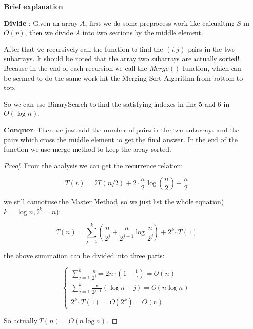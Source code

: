 \documentclass[12pt,a4paper]{article}
\theoremstyle{definition}
\begin{document}
\begin{enumerate}
	\textbf{Brief explanation}


	\textbf{Divide} : Given an array $A$, first we do some preprocess work like calcualting $S$ in $O(n)$, then we divide $A$ into two
	sections by the middle element.
	
	After that we recursively call the function to find the $(i, j)$ pairs in the two subarrays. 
   It should be noted that the array two subarrays are actually sorted! Because in the end of each recursion we call the $Merge()$ function, which can be seemed to do the same work int the
	Merging Sort Algorithm from bottom to top. 
	
	So we can use BinarySearch to find the satisfying indexes in line 5 and 6 in $O(\log n)$.

	\textbf{Conquer}: Then we just add the number of pairs in the two subarrays and the pairs which cross the middle element to get the final answer. In the end of the function we use merge method to keep the array sorted.
	\begin{proof}
	 From the analysis we can get the recurrence relation:
	 
	 \begin{equation*}
		 T(n) = 2T(n/2) + 2\cdot\frac{n}{2}\log(\frac{n}{2}) + \frac{n}{2} 
	 \end{equation*}

	 we still cannotuse the Master Method, so we just list the whole equation($k=\log n, 2^k=n$):

	\begin{equation*}
		T(n) = \sum_{j=1}^{k}(\frac{n}{2^j} + \frac{n}{2^{j - 1}}\log{\frac{n}{2^j}}) + 2^k\cdot T(1)
	\end{equation*}
   
	the above summation can be divided into three parts:

	\begin{equation*}
		\left\{
	     \begin{array}{lr}		
			\sum_{j=1}^{k}\frac{n}{2^j} = 2n\cdot{(1-\frac{1}{n})} = O(n)\\

			\sum_{j=1}^{k}\frac{n}{2^{j - 1}}(\log n - j) = O(n\log n) \\

			2^k\cdot T(1) = O(2^k) = O(n)
		 \end{array}
		\right.
	\end{equation*}


	So actually $T(n) = O(n\log n)$.



\end{proof}
\end{enumerate}
\end{document}
